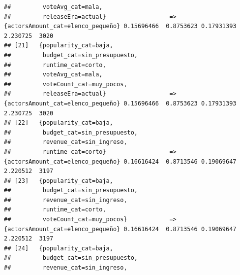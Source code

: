 \documentclass[
]{article}
\begin{document}
\begin{verbatim}
##         voteAvg_cat=mala,                                                                                                       
##         releaseEra=actual}                  => {actorsAmount_cat=elenco_pequeño} 0.15696466  0.8753623 0.17931393 2.230725  3020
## [21]   {popularity_cat=baja,                                                                                                    
##         budget_cat=sin_presupuesto,                                                                                             
##         runtime_cat=corto,                                                                                                      
##         voteAvg_cat=mala,                                                                                                       
##         voteCount_cat=muy_pocos,                                                                                                
##         releaseEra=actual}                  => {actorsAmount_cat=elenco_pequeño} 0.15696466  0.8753623 0.17931393 2.230725  3020
## [22]   {popularity_cat=baja,                                                                                                    
##         budget_cat=sin_presupuesto,                                                                                             
##         revenue_cat=sin_ingreso,                                                                                                
##         runtime_cat=corto}                  => {actorsAmount_cat=elenco_pequeño} 0.16616424  0.8713546 0.19069647 2.220512  3197
## [23]   {popularity_cat=baja,                                                                                                    
##         budget_cat=sin_presupuesto,                                                                                             
##         revenue_cat=sin_ingreso,                                                                                                
##         runtime_cat=corto,                                                                                                      
##         voteCount_cat=muy_pocos}            => {actorsAmount_cat=elenco_pequeño} 0.16616424  0.8713546 0.19069647 2.220512  3197
## [24]   {popularity_cat=baja,                                                                                                    
##         budget_cat=sin_presupuesto,                                                                                             
##         revenue_cat=sin_ingreso,                                                                                                

\end{verbatim}
\end{document}
